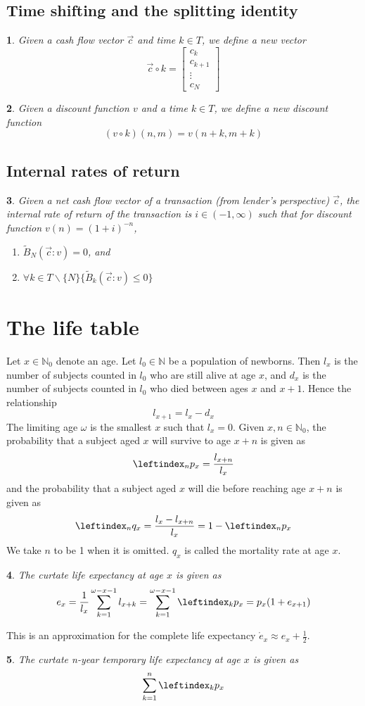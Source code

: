 \documentclass{article}
\newtheorem*{defn}{}
\begin{document}
\subsection{Time shifting and the splitting identity}
\begin{defn}
Given a cash flow vector $\vec{c}$ and time $k \in T$, we define a new vector
$$
\vec{c} \circ k = 
\begin{bmatrix}
c_k \\
c_{k+1} \\
\vdots \\
c_N
\end{bmatrix}
$$
\end{defn}
\begin{defn}
Given a discount function $v$ and a time $k \in T$, we define a new discount function
$$
(v \circ k)(n,m) = v(n+k,m+k)
$$
\end{defn}
\subsection{Internal rates of return}
\begin{defn}
Given a net cash flow vector of a transaction (from lender's perspective) $\vec{c}$, the internal rate of return of the transaction is $i \in (-1,\infty)$ such that for discount function $v(n)=(1+i)^{-n}$,
\begin{enumerate}
\item $\tilde{B}_N (\vec{c} \colon v) = 0$, and
\item $\forall k \in T \backslash \{N\} \{\tilde{B}_k (\vec{c} \colon v) \leq 0 \}$
\end{enumerate}
\end{defn}
\section{The life table}
Let $x \in \mathbb{N}_0$ denote an age. Let $l_0 \in \mathbb{N}$ be a population of newborns. Then $l_x$ is the number of subjects counted in $l_0$ who are still alive at age $x$, and $d_x$ is the number of subjects counted in $l_0$ who died between ages $x$ and $x+1$. Hence the
relationship
$$
l_{x+1} = l_x - d_x
$$
The limiting age $\omega$ is the smallest $x$ such that $l_x = 0$. Given $x,n \in \mathbb{N}_0$, the probability that a subject aged $x$ will survive to age $x+n$ is given as
$$
\leftindex_n p_x = \frac{l_{x+n}}{l_x}
$$
and the probability that a subject aged $x$ will die before reaching age $x+n$ is given as
$$
\leftindex_n q_x = \frac {l_x - l_{x+n}} {l_x} = 1 - \leftindex_n p_x
$$
We take $n$ to be 1 when it is omitted. $q_x$ is called the mortality rate at age $x$.
\begin{defn}
The curtate life expectancy at age $x$ is given as
$$
e_x = \frac{1}{l_x}\sum_{k=1}^{\omega-x-1} {l_{x+k}} = \sum_{k=1}^{\omega-x-1} {\leftindex_k p_x} = p_x(1+e_{x+1})
$$
\end{defn}
This is an approximation for the complete life expectancy $\mathring{e}_x \approx e_x + \frac{1}{2}$.
\begin{defn}
The curtate n-year temporary life expectancy at age $x$ is given as
$$
\sum_{k=1}^{n} {\leftindex_k p_x}
$$
\end{defn}
\end{document}
